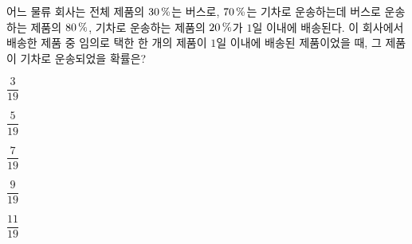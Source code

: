 어느 물류 회사는 전체 제품의 $30\mkern3mu \%$는 버스로, $70\mkern3mu \%$는 기차로 운송하는데 버스로 운송하는 제품의 $80\mkern3mu \%$, 기차로 운송하는 제품의 $20\mkern3mu \%$가 $1$일 이내에 배송된다. 이 회사에서 배송한 제품 중 임의로 택한 한 개의 제품이 $1$일 이내에 배송된 제품이었을 때, 그 제품이 기차로 운송되었을 확률은?
\begin{choices32}{\rule[-3ex]{0pt}{8ex}$\dfrac{3}{19}$}{\rule[-3ex]{0pt}{8ex}$\dfrac{5}{19}$}{\rule[-3ex]{0pt}{8ex}$\dfrac{7}{19}$}{\rule[-3ex]{0pt}{8ex}$\dfrac{9}{19}$}{\rule[-3ex]{0pt}{8ex}$\dfrac{11}{19}$}\end{choices32}
